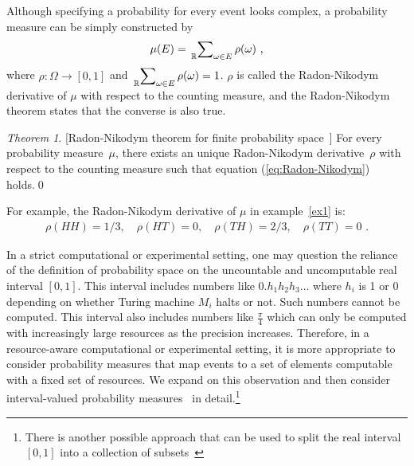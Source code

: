 \documentclass{article}
\theoremstyle{remark}
\newtheorem{thm}{Theorem}
\newcommand{\pmeas}{\ensuremath{\mu}}
\newcommand{\yutsung}[1]{\fbox{\begin{minipage}{0.9\textwidth}\color{purple}{Yu-Tsung says: #1}\end{minipage}}}
\newcommand{\amr}[1]{\fbox{\begin{minipage}{0.9\textwidth}\color{green}{Amr says: #1}\end{minipage}}}
\begin{document}
Although specifying a probability for every event looks complex, a
probability measure can be simply constructed by 
\begin{equation}
\pmeas(E)=\sideset{_{\mathbb{R}}}{_{\omega\in E}}\sum\rho(\omega)\textrm{ ,}\label{eq:Radon-Nikodym}
\end{equation}
where $\rho:\Omega\rightarrow[0,1]$ and $\sideset{_{\mathbb{R}}}{_{\omega\in E}}\sum\rho(\omega)=1$.
$\rho$ is called the Radon-Nikodym derivative of $\pmeas$ with respect
to the counting measure, and the Radon-Nikodym theorem states that
the converse is also true.

\begin{thm}{[}Radon-Nikodym theorem for finite probability space~\cite{Nikodym1930,Kolmogorov1950,Folland2013,Swart2013}{]}
For every probability measure~$\pmeas$, there exists an unique Radon-Nikodym
derivative~$\rho$ with respect to the counting measure such that
equation (\ref{eq:Radon-Nikodym}) holds.\qed\end{thm}

For example, the Radon-Nikodym derivative of $\pmeas$ in example~\ref{ex1}
is: 
\[
\begin{array}{rcl}
\rho\left(HH\right)=1/3,\quad\rho\left(HT\right)=0,\quad\rho\left(TH\right)=2/3,\quad\rho\left(TT\right)=0\textrm{ .}\end{array}
\]

In a strict computational or experimental setting, one may question
the reliance of the definition of probability space on the uncountable
and uncomputable real interval $[0,1]$. This interval includes numbers
like $0.h_1h_2h_3\ldots$ where $h_i$ is 1 or 0 depending on whether
Turing machine $M_i$ halts or not. Such numbers cannot be
computed. This interval also includes numbers like $\frac{\pi}{4}$
which can only be computed with increasingly large resources as the
precision increases.
Therefore, in a resource-aware computational or experimental setting,
it is more appropriate to consider probability measures that map
events to a set of elements computable with a fixed set of
resources. We expand on this observation and then consider
interval-valued probability
measures~\cite{Dempster1967,Shafer1976,JamisonLodwick2004}
in detail.\footnote{There is another possible approach that can be
  used to split the real interval $[0,1]$ into a collection of
  subsets~\cite{PuriRalescu1983} \amr{need to explain the
    connection and why we are not using it.}}
\end{document}
